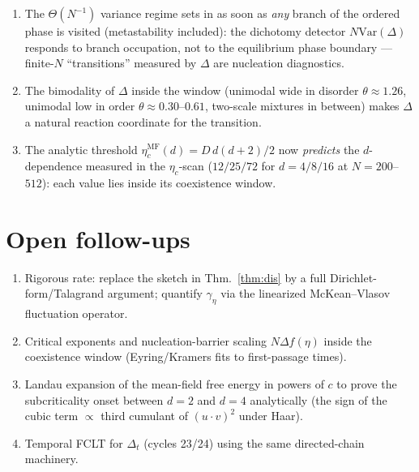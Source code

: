 \documentclass[11pt]{article}
\theoremstyle{definition}
\newcommand{\Var}{\mathrm{Var}}
\begin{document}
\begin{enumerate}
\item The $\Theta(N^{-1})$ variance regime sets in as soon as \emph{any} branch of
the ordered phase is visited (metastability included): the dichotomy detector
$N\Var(\Delta)$ responds to branch occupation, not to the equilibrium phase
boundary --- finite-$N$ ``transitions'' measured by $\Delta$ are nucleation
diagnostics.
\item The bimodality of $\Delta$ inside the window (unimodal wide in disorder
$\theta\approx1.26$, unimodal low in order $\theta\approx0.30$--$0.61$, two-scale
mixtures in between) makes $\Delta$ a natural reaction coordinate for the
transition.
\item The analytic threshold $\eta_c^{\mathrm{MF}}(d)=D\,d(d+2)/2$ now
\emph{predicts} the $d$-dependence measured in the $\eta_c$-scan
($12/25/72$ for $d=4/8/16$ at $N=200$--$512$): each value lies inside its
coexistence window.
\end{enumerate}

\section{Open follow-ups}
\begin{enumerate}
\item Rigorous rate: replace the sketch in Thm.~\ref{thm:dis} by a full
Dirichlet-form/Talagrand argument; quantify $\gamma_\eta$ via the linearized
McKean--Vlasov fluctuation operator.
\item Critical exponents and nucleation-barrier scaling $N\Delta f(\eta)$ inside the
coexistence window (Eyring/Kramers fits to first-passage times).
\item Landau expansion of the mean-field free energy in powers of $c$ to prove the
subcriticality onset between $d=2$ and $d=4$ analytically (the sign of the cubic
term $\propto$ third cumulant of $(u\cdot v)^2$ under Haar).
\item Temporal FCLT for $\Delta_t$ (cycles 23/24) using the same directed-chain
machinery.
\end{enumerate}
\end{document}
